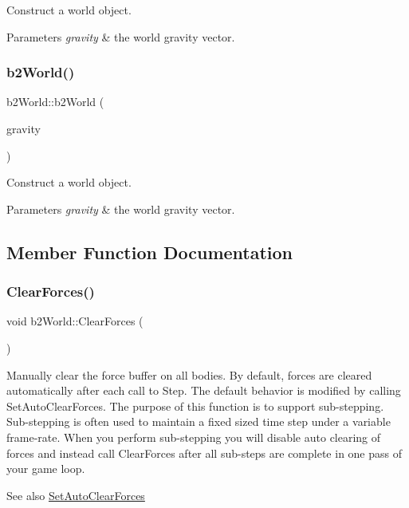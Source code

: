 Construct a world object. 
\begin{DoxyParams}{Parameters}
{\em gravity} & the world gravity vector. \\
\hline
\end{DoxyParams}
\mbox{\label{classb2World_aeccc87fd9e36702c821a8244ca7cd875}} 
\subsubsection{\texorpdfstring{b2\+World()}{b2World()}\hspace{0.1cm}{\footnotesize\ttfamily [2/2]}}
{\footnotesize\ttfamily b2\+World\+::b2\+World (\begin{DoxyParamCaption}\item[{const \hyperlink{structb2Vec2}{b2\+Vec2} \&}]{gravity }\end{DoxyParamCaption})}

Construct a world object. 
\begin{DoxyParams}{Parameters}
{\em gravity} & the world gravity vector. \\
\hline
\end{DoxyParams}


\subsection{Member Function Documentation}
\mbox{\label{classb2World_ac082ab4c4ad0b1c5ec4674315eeec643}} 
\subsubsection{\texorpdfstring{Clear\+Forces()}{ClearForces()}\hspace{0.1cm}{\footnotesize\ttfamily [1/2]}}
{\footnotesize\ttfamily void b2\+World\+::\+Clear\+Forces (\begin{DoxyParamCaption}{ }\end{DoxyParamCaption})}

Manually clear the force buffer on all bodies. By default, forces are cleared automatically after each call to Step. The default behavior is modified by calling Set\+Auto\+Clear\+Forces. The purpose of this function is to support sub-\/stepping. Sub-\/stepping is often used to maintain a fixed sized time step under a variable frame-\/rate. When you perform sub-\/stepping you will disable auto clearing of forces and instead call Clear\+Forces after all sub-\/steps are complete in one pass of your game loop. \begin{DoxySeeAlso}{See also}
\hyperlink{classb2World_aa2bced28ddef5bbb00ed5666e5e9f620}{Set\+Auto\+Clear\+Forces} 
\end{DoxySeeAlso}
\mbox{\label{classb2World_ac082ab4c4ad0b1c5ec4674315eeec643}} 
